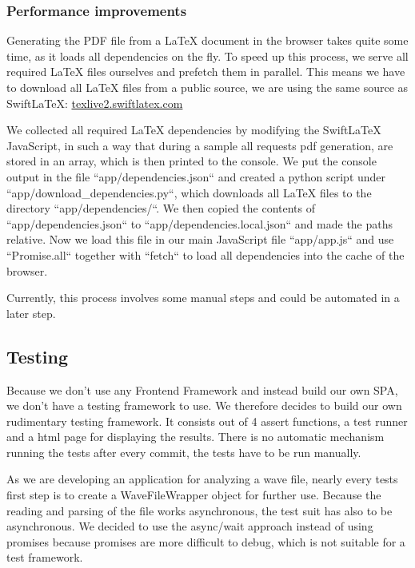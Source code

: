 \subsubsection{Performance improvements}
Generating the PDF file from a LaTeX document in the browser takes quite some time, as it loads all dependencies
on the fly.
To speed up this process, we serve all required LaTeX files ourselves and prefetch them in parallel.
This means we have to download all LaTeX files from a public source, we are using the same source as SwiftLaTeX:
\href{https://texlive2.swiftlatex.com/}{texlive2.swiftlatex.com}

We collected all required LaTeX dependencies by modifying the SwiftLaTeX JavaScript, in such a way that during a sample
all requests pdf generation, are stored in an array, which is then printed to the console.
We put the console output in the file ``app/dependencies.json`` and created a python script under ``app/download\_dependencies.py``,
which downloads all LaTeX files to the directory ``app/dependencies/``.
We then copied the contents of ``app/dependencies.json`` to ``app/dependencies.local.json`` and made the paths relative.
Now we load this file in our main JavaScript file ``app/app.js`` and use ``Promise.all`` together with ``fetch`` to load
all dependencies into the cache of the browser.

Currently, this process involves some manual steps and could be automated in a later step.

\subsection{Testing}\label{subsec:testing}
Because we don't use any Frontend Framework and instead build our own SPA, we don't have a testing framework to use.
We therefore decides to build
our own rudimentary testing framework.
It consists out of 4 assert functions, a test runner and a html page for displaying the results.
There is no automatic mechanism running the tests after every commit, the tests have to be run manually. 

As we are developing an application for analyzing a wave file, nearly every tests first step is to create a WaveFileWrapper object for further use.
Because the reading and parsing of the file works asynchronous, the test suit has also to be asynchronous.
We decided to use the async/wait approach instead of using promises because promises are more difficult to debug, which is not suitable for a test framework.

